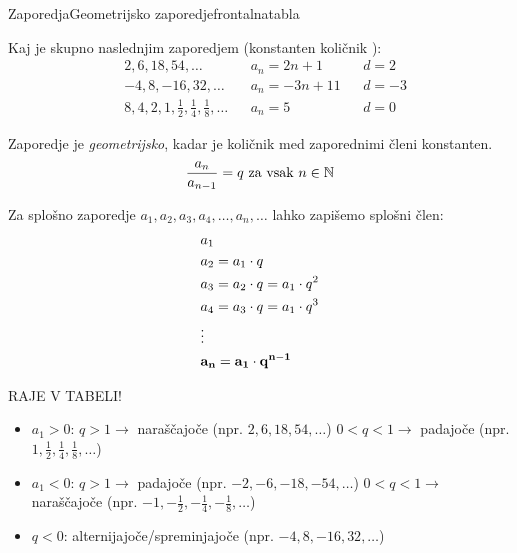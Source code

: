 \begin{priprava}{}{}{Zaporedja}{Geometrijsko zaporedje}{frontalna}{tabla}

 Kaj je skupno naslednjim zaporedjem (konstanten količnik ):
\begin{align*}
    & 2, 6, 18, 54, \ldots && a_n = 2n+1 && d = 2 \\
    & -4, 8, -16, 32,  \ldots && a_n = -3n+11 && d = -3 \\
    & 8, 4, 2, 1, \frac{1}{2}, \frac{1}{4}, \frac{1}{8}, \ldots && a_n = 5 && d = 0
\end{align*}

Zaporedje je \emph{geometrijsko}, kadar je količnik med zaporednimi členi konstanten.
$$ \frac{a_n}{a_{n-1}} = q \text{ za vsak } n \in \mathbb{N} $$

Za splošno zaporedje $ a_1, a_2, a_3, a_4, \ldots, a_n, \ldots $ lahko zapišemo splošni člen:
\begin{align*}
    & a_1 \\
    & a_2 = a_1 \cdot q \\
    & a_3 = a_2 \cdot q = a_1 \cdot q^2 \\
    & a_4 = a_3 \cdot q = a_1 \cdot q^3 \\
    & \vdots \\
    & \bf{a_n = a_1 \cdot q^{n-1}}
\end{align*}

RAJE V TABELI!

\begin{itemize}
    \item $ a_1 > 0 $:
        \subitem $ q > 1 \rightarrow $ naraščajoče (npr. $ 2, 6, 18, 54, \ldots $)
        \subitem $ 0 < q < 1 \rightarrow $ padajoče (npr. $ 1, \frac{1}{2}, \frac{1}{4}, \frac{1}{8}, \ldots $)
    \item $ a_1 < 0 $:
        \subitem $ q > 1 \rightarrow $ padajoče (npr. $ -2, -6, -18, -54, \ldots $)
        \subitem $ 0 < q < 1 \rightarrow $ naraščajoče (npr. $ -1, -\frac{1}{2}, -\frac{1}{4}, -\frac{1}{8}, \ldots $)
    \item $ q < 0 $: alternijajoče/spreminjajoče (npr. $ -4, 8, -16, 32,  \ldots $)
\end{itemize}

\newpage


\end{priprava}
